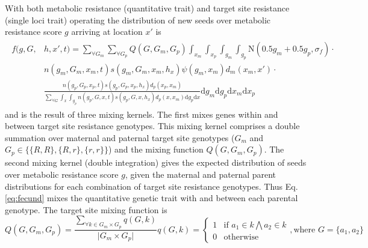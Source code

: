 \documentclass[12pt, a4paper]{article}
\begin{document}
With both metabolic resistance (quantitative trait) and target site resistance (single loci trait) operating the distribution of new seeds over metabolic resistance score $g$ arriving at location $x'$ is      
\begin{align}
\label{eq:fecund}
\begin{split}
	f(g, G, &h, x', t) = \displaystyle \sum_{\forall G_m}\sum_{\forall G_p} Q(G, G_m, G_p) \int_{x_m}\int_{x_p}\int_{g_m}\int_{g_p} \text{N}(0.5 g_m + 0.5 g_p, \sigma_f)\cdot\\
	&n(g_m, G_m, x_m, t)s(g_m, G_m, x_m, h_x)\psi(g_m, x_m)d_m(x_m, x')\cdot \\
	&\frac{n(g_p, G_p, x_p, t)s(g_p, G_p, x_p, h_x)d_p(x_p, x_m)}{\sum_{\forall G}\int_{x}\int_{g_p} n(g_p, G, x, t)s(g_p, G, x, h_x)d_p(x, x_m)\text{d}g_p\text{d}x} \text{d}g_m \text{d}g_p\text{d}x_m\text{d}x_p
\end{split}
\end{align}           
and is the result of three mixing kernels. The first mixes genes within and between target site resistance genotypes. This mixing kernel comprises a double summation over maternal and paternal target site genotypes ($G_m$ and $G_p \in \{\{R, R\}, \{R, r\}, \{r, r\} \}$) and the mixing function $Q(G, G_m, G_p)$. The second mixing kernel (double integration) gives the expected distribution of seeds over metabolic resistance score $g$, given the maternal and paternal parent distributions for each combination of target site resistance genotypes. Thus Eq. \ref{eq:fecund} mixes the quantitative genetic trait with and between each parental genotype. The target site mixing function is
\begin{subequations}
\begin{equation}\label{eq:TSR_mixing_kern}
	Q(G, G_m, G_p) = \frac{\sum_{\forall k \in G_m \times G_p} q(G, k)}{\vert G_m \times G_p \vert}
\end{equation}      
\begin{equation}\label{eq:allel_count}
	q(G, k) = \begin{cases}
		1 &\text{if } a_1 \in k \bigwedge a_2 \in k\\
		0 &\text{otherwise} 
	\end{cases}, \text{where } G = \{a_1, a_2\}
\end{equation} 
\end{subequations}
\end{document}
